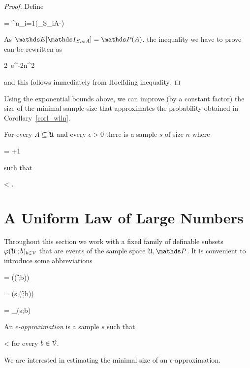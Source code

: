 \documentclass[scombinatorics.tex]{subfiles}
\begin{document}
\begin{proof}
  Define
  
  {=}
  {\sum^n_{i=1}\Big(\Indicator_{S_i\in A}-\Ex[\Indicator_{S_i\in A}]\Big)}

  As $\Ex[\Indicator_{S_i\in A}]=\Pr(A)$, the inequality we have to prove can be rewritten as 

  {\le}
  {2\, e^{-2n\epsilon^2}}

  and this follows immediately from Hoeffding inequality.
  \end{proof}

Using the exponential bounds above, we can improve (by a constant factor) the size of the minimal sample size that approximates the probability obtained in Corollary~\ref{corl_wlln}.

\begin{corollary}
  For every $A\subseteq\EuScript U$ and every $\epsilon>0$ there is a sample $s$ of size $n$ where

  {=}
  {\left\lfloor{}+1\right\rfloor} 
      
  such that

  {<}
  {\epsilon.}\QED
\end{corollary}
\section{A Uniform Law of Large Numbers}\label{uniform}

Throughout this section we work with a fixed family of definable subsets $\varphi(\EuScript U\,;b)_{b\in\EuScript V}$ that are events of the sample space $\U,\Pr$.
It is convenient to introduce some abbreviations

{=}
{\Pr\Big(\phi(\U\,;b)\Big)}

{=}
{\Fr\Big(s,\phi(\U\,;b)\Big)}

{=}
{\Indicator_{\phi(s;b)}}

An \emph{$\epsilon$-approximation\/} is a sample $s$ such that

{<}
{\epsilon}
\hfill for every $b\in\EuScript V$.

We are interested in estimating the minimal size of an $\epsilon$-approximation.
\end{document}
